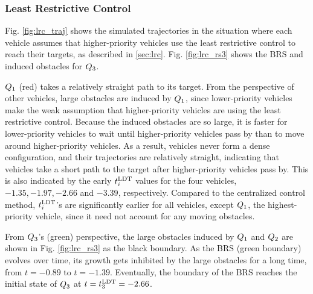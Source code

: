 \subsubsection{Least Restrictive Control}
Fig. \ref{fig:lrc_traj} shows the simulated trajectories in the situation where each vehicle assumes that higher-priority vehicles use the least restrictive control to reach their targets, as described in \ref{sec:lrc}. Fig. \ref{fig:lrc_rs3} shows the BRS and induced obstacles for $Q_3$.

$Q_1$ (red) takes a relatively straight path to its target. From the perspective of other vehicles, large obstacles are induced by $Q_1$, since lower-priority vehicles make the weak assumption that higher-priority vehicles are using the least restrictive control. Because the induced obstacles are so large, it is faster for lower-priority vehicles to wait until higher-priority vehicles pass by than to move around higher-priority vehicles. As a result, vehicles never form a dense configuration, and their trajectories are relatively straight, indicating that vehicles take a short path to the target after higher-priority vehicles pass by. This is also indicated by the early $t^\text{LDT}_i$ values for the four vehicles, $-1.35, -1.97, -2.66$ and $-3.39$, respectively. Compared to the centralized control method, $t^\text{LDT}_i$'s are significantly earlier for all vehicles, except $Q_1$, the highest-priority vehicle, since it need not account for any moving obstacles. 

From $Q_3$'s (green) perspective, the large obstacles induced by $Q_1$ and $Q_2$ are shown in Fig. \ref{fig:lrc_rs3} as the black boundary. As the BRS (green boundary) evolves over time, its growth gets inhibited by the large obstacles for a long time, from $t=-0.89$ to $t=-1.39$. Eventually, the boundary of the BRS reaches the initial state of $Q_3$ at $t = t^\text{LDT}_3 = -2.66$.

